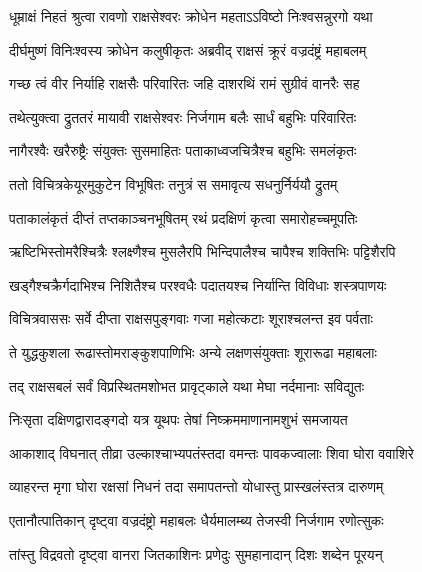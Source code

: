
\twolineshloka
{धूम्राक्षं निहतं श्रुत्वा रावणो राक्षसेश्वरः}
{क्रोधेन महताऽऽविष्टो निःश्वसन्नुरगो यथा} %

\twolineshloka
{दीर्घमुष्णं विनिःश्वस्य क्रोधेन कलुषीकृतः}
{अब्रवीद् राक्षसं क्रूरं वज्रदंष्ट्रं महाबलम्} %

\twolineshloka
{गच्छ त्वं वीर निर्याहि राक्षसैः परिवारितः}
{जहि दाशरथिं रामं सुग्रीवं वानरैः सह} %

\twolineshloka
{तथेत्युक्त्वा द्रुततरं मायावी राक्षसेश्वरः}
{निर्जगाम बलैः सार्धं बहुभिः परिवारितः} %

\twolineshloka
{नागैरश्वैः खरैरुष्ट्रैः संयुक्तः सुसमाहितः}
{पताकाध्वजचित्रैश्च बहुभिः समलंकृतः} %

\twolineshloka
{ततो विचित्रकेयूरमुकुटेन विभूषितः}
{तनुत्रं स समावृत्य सधनुर्निर्ययौ द्रुतम्} %

\twolineshloka
{पताकालंकृतं दीप्तं तप्तकाञ्चनभूषितम्}
{रथं प्रदक्षिणं कृत्वा समारोहच्चमूपतिः} %

\twolineshloka
{ऋष्टिभिस्तोमरैश्चित्रैः श्लक्ष्णैश्च मुसलैरपि}
{भिन्दिपालैश्च चापैश्च शक्तिभिः पट्टिशैरपि} %

\twolineshloka
{खड्गैश्चक्रैर्गदाभिश्च निशितैश्च परश्वधैः}
{पदातयश्च निर्यान्ति विविधाः शस्त्रपाणयः} %

\twolineshloka
{विचित्रवाससः सर्वे दीप्ता राक्षसपुङ्गवाः}
{गजा महोत्कटाः शूराश्चलन्त इव पर्वताः} %

\twolineshloka
{ते युद्धकुशला रूढास्तोमराङ्कुशपाणिभिः}
{अन्ये लक्षणसंयुक्ताः शूरारूढा महाबलाः} %

\twolineshloka
{तद् राक्षसबलं सर्वं विप्रस्थितमशोभत}
{प्रावृट्काले यथा मेघा नर्दमानाः सविद्युतः} %

\twolineshloka
{निःसृता दक्षिणद्वारादङ्गदो यत्र यूथपः}
{तेषां निष्क्रममाणानामशुभं समजायत} %

\twolineshloka
{आकाशाद् विघनात् तीव्रा उल्काश्चाभ्यपतंस्तदा}
{वमन्तः पावकज्वालाः शिवा घोरा ववाशिरे} %

\twolineshloka
{व्याहरन्त मृगा घोरा रक्षसां निधनं तदा}
{समापतन्तो योधास्तु प्रास्खलंस्तत्र दारुणम्} %

\twolineshloka
{एतानौत्पातिकान् दृष्ट्वा वज्रदंष्ट्रो महाबलः}
{धैर्यमालम्ब्य तेजस्वी निर्जगाम रणोत्सुकः} %

\twolineshloka
{तांस्तु विद्रवतो दृष्ट्वा वानरा जितकाशिनः}
{प्रणेदुः सुमहानादान् दिशः शब्देन पूरयन्} %

